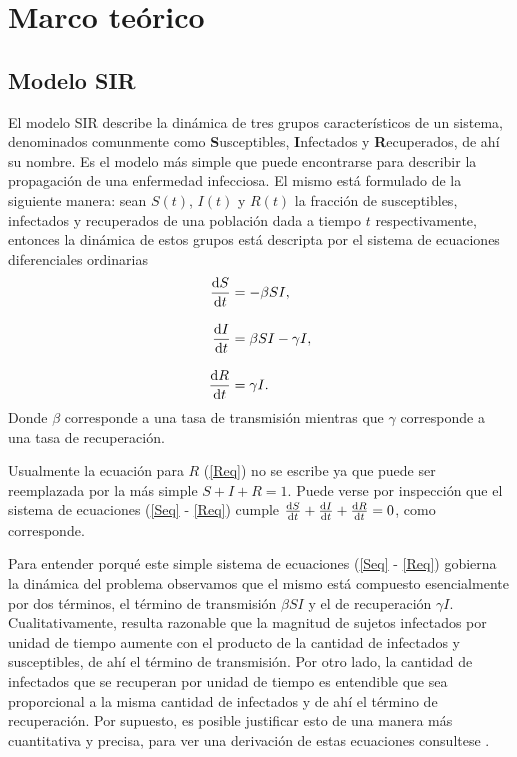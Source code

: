 \chapter{Marco teórico}
\graphicspath{{figs/}}
\label{Modelo teórico}

\section{Modelo SIR}
\label{S:Modelo SIR}

El modelo SIR describe la dinámica de tres grupos característicos de un sistema, denominados comunmente como \textbf{S}usceptibles, \textbf{I}nfectados y
\textbf{R}ecuperados, de ahí su nombre. Es el modelo más simple que puede encontrarse para describir la propagación de una enfermedad 
infecciosa. El mismo está formulado de la siguiente manera: sean $S(t)$, $I(t)$ y $R(t)$ la fracción de susceptibles, infectados
y recuperados de una población dada a tiempo $t$ respectivamente, entonces la dinámica de estos grupos está descripta por el sistema de
ecuaciones diferenciales ordinarias
\begin{align}
  \dv{S}{t}&=-\beta SI,\label{Seq}\\[.3cm]
  \dv{I}{t}&=\beta SI - \gamma I,\label{Ieq}\\[.3cm]
  \dv{R}{t}&=\gamma I.\label{Req}
\end{align}
Donde $\beta$ corresponde a una tasa de transmisión mientras que $\gamma$ corresponde a una tasa de recuperación.

Usualmente la ecuación 
para $R$ (\ref{Req}) no se escribe ya que puede ser reemplazada por la más simple $S+I+R=1$. Puede verse por inspección que el sistema de ecuaciones
(\ref{Seq} - \ref{Req}) cumple $\dv{S}{t}+\dv{I}{t}+\dv{R}{t}=0$, como corresponde.

Para entender porqué este simple sistema de ecuaciones (\ref{Seq} - \ref{Req}) gobierna la dinámica del problema observamos que el mismo 
está compuesto esencialmente por dos términos, el término de transmisión $\beta SI$ y el de recuperación $\gamma I$. Cualitativamente, resulta 
razonable que la magnitud de sujetos infectados por unidad de tiempo aumente con el producto de la cantidad de infectados y susceptibles, de ahí 
el término de transmisión. Por otro lado, la cantidad de infectados que se recuperan por unidad de tiempo es entendible que sea proporcional a la
misma cantidad de infectados y de ahí el término de recuperación. Por supuesto, es posible justificar esto de una manera más cuantitativa y precisa, para 
ver una derivación de estas ecuaciones consultese \cite{SIR,keeling:infectious_diseases}.

